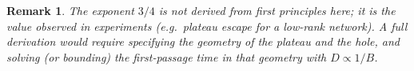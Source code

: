 \documentclass[11pt]{article}
\newtheorem{remark}{Remark}
\begin{document}
\begin{remark}
The exponent $3/4$ is not derived from first principles here; it is the value observed in experiments (e.g.\ plateau escape for a low-rank network). A full derivation would require specifying the geometry of the plateau and the hole, and solving (or bounding) the first-passage time in that geometry with $D \propto 1/B$.
\end{remark}
\end{document}
